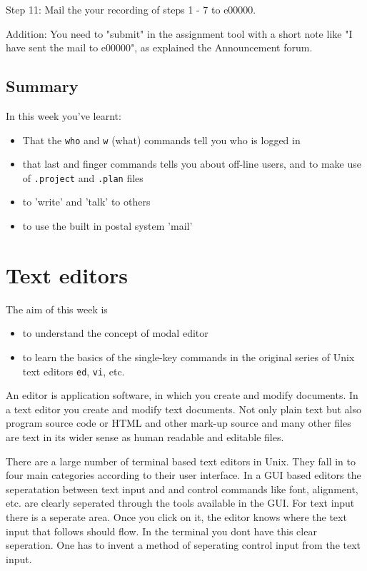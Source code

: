 \documentclass[11pt,a4paper,twoside]{article}
\begin{document}
Step 11: Mail the your recording of steps 1 - 7 to e00000.

Addition: You need to "submit" in the assignment tool with a short note like "I have sent the mail to e00000", as explained the Announcement forum.

\subsection*{Summary}

In this week you've learnt:
\begin{itemize}
\item That the \texttt{who} and \texttt{w} (what) commands tell you who 
is logged in

\item that last and finger commands tells you about off-line users,
and to make use of \texttt{.project} and \texttt{.plan} files

\item to 'write' and 'talk' to others

\item to use the built in postal system 'mail'

\end{itemize}

\newpage

\section{Text editors}

The aim of this week is
\begin{itemize}
\item to understand the concept of modal editor 
\item to learn the basics of the single-key commands in the original series
of Unix text editors \texttt{ed}, \texttt{vi}, etc.
\end{itemize}

An editor is application software, in which you create and modify documents.
In a text editor you create and modify text documents. Not only plain text
but also program source code or HTML and other mark-up source and many
other files are text in its wider sense as human readable and editable
files.

There are a large number of terminal based text editors in Unix.  They 
fall in to four main categories according to their user interface. In a
GUI based editors the seperatation between text input and and control
commands like font, alignment, etc. are clearly seperated through the
tools available in the GUI. For text input there is a seperate area. Once 
you click on it, the editor knows where the text input that follows should
flow.  In the terminal you dont have this clear seperation. One has to
invent a method of seperating control input from the text input.
\end{document}
